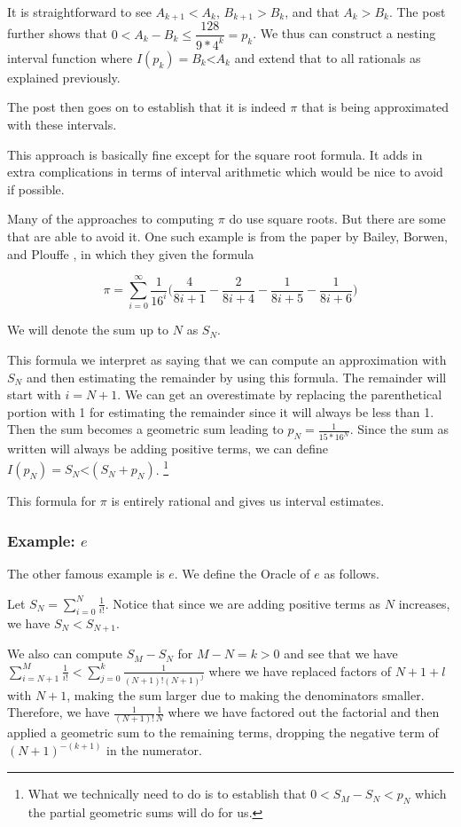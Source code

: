 \documentclass[12pt]{article}
\theoremstyle{remark}
\newcommand{\lt}{\mathord{<}}
\begin{document}
It is straightforward to see $A_{k+1} < A_k$, $B_{k+1} > B_k$, and that $A_k > B_k$. The post further shows that $0 < A_k - B_k \leq \dfrac{128}{9*4^k} = p_k $. We thus can construct a nesting interval function where $I(p_k) = B_k\lt A_k$ and extend that to all rationals as explained previously. 

The post then goes on to establish that it is indeed $\pi$ that is being approximated with these intervals.

This approach is basically fine except for the square root formula. It adds in extra complications in terms of interval arithmetic which would be nice to avoid if possible. 

Many of the approaches to computing $\pi$ do use square roots. But there are some that are able to avoid it. One such example is from the paper by Bailey, Borwen, and Plouffe \cite{BBP}, in which they given the formula 

\[ 
\pi = \sum_{i=0}^\infty \frac{1}{16^i} \bigg( \frac{4}{8i+1} - \frac{2}{8i+4} - \frac{1}{8i+5} - \frac{1}{8i+6} \bigg)
\]

We will denote the sum up to $N$ as $S_N$.

This formula we interpret as saying that we can compute an approximation with $S_N$ and then estimating the remainder by using this formula. The remainder will start with $i=N+1$. We can get an overestimate by replacing the parenthetical portion with 1 for estimating the remainder since it will always be less than 1. Then the sum becomes a geometric sum leading to $p_N = \frac{1}{15*16^N}$. Since the sum as written will always be adding positive terms, we can define $I(p_N) = S_N \lt (S_N + p_N)$. \footnote{What we technically need to do is to establish that $0 < S_M - S_N < p_N $ which the partial geometric sums will do for us.}

This formula for $\pi$ is entirely rational and gives us interval estimates.

\subsubsection{Example: $e$}

The other famous example is $e$. We define the Oracle of $e$ as follows. 

Let $S_N = \sum_{i=0}^N \frac{1}{i!}$. Notice that since we are adding positive terms as $N$ increases, we have $S_N < S_{N+1}$. 

We also can compute $S_M - S_N$ for $M - N = k > 0$ and see that we have $\sum_{i=N+1}^M \frac{1}{i!} <  \sum_{j=0}^k  \frac{1}{(N+1)!(N+1)^j} $ where we have replaced factors of $N+1 + l$ with $N+1$, making the sum larger due to making the denominators smaller. Therefore, we have $\frac{1}{(N+1)!} \frac{1}{N}$ where we have factored out the factorial and then applied a geometric sum to the remaining terms, dropping the negative term of $(N+1)^{-(k+1)}$ in the numerator. 
\end{document}
